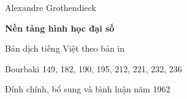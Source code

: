 \documentclass[11pt,twoside,openany]{book}
\begin{document}
\frontmatter
\begin{titlepage}
\centering\vspace*{2cm}
{\Large Alexandre Grothendieck\par}\vspace{1.5cm}
{\Huge\bfseries Nền tảng hình học đại số\par}\vspace{1.2cm}
{\Large Bản dịch tiếng Việt theo bản in\par}
\vfill
{Bourbaki 149, 182, 190, 195, 212, 221, 232, 236\par}
{Đính chính, bổ sung và bình luận năm 1962\par}
\end{titlepage}

\tableofcontents
\mainmatter

















\end{document}
